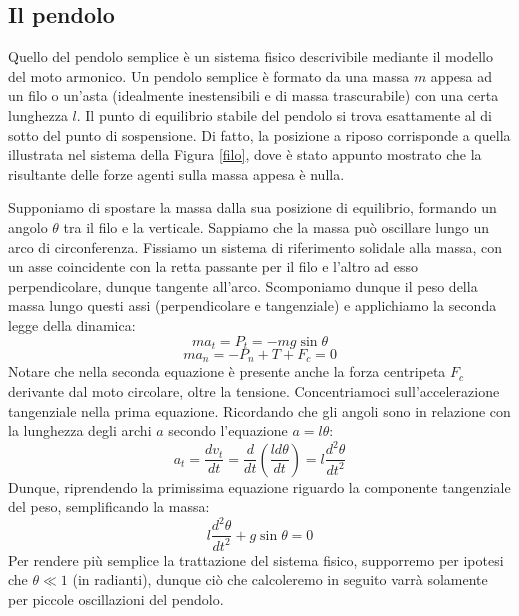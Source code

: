\subsection{Il pendolo}
Quello del pendolo semplice è un sistema fisico descrivibile mediante
il modello del moto armonico. Un pendolo semplice è formato da una massa
$m$ appesa ad un filo o un'asta (idealmente inestensibili e di massa
trascurabile) con una certa lunghezza $l$. Il punto di equilibrio stabile del pendolo si trova
esattamente al di sotto del punto di sospensione. Di fatto, la posizione
a riposo corrisponde a quella illustrata nel sistema della Figura
\ref{filo}, dove è stato appunto mostrato che la risultante delle
forze agenti sulla massa appesa è nulla.

Supponiamo di spostare la massa dalla sua posizione di equilibrio,
formando un angolo $\theta$ tra il filo e la verticale. Sappiamo che
la massa può oscillare lungo un arco di circonferenza. Fissiamo un
sistema di riferimento solidale alla massa, con un asse coincidente con
la retta passante per il filo e l'altro ad esso perpendicolare, dunque
tangente all'arco. Scomponiamo dunque il peso della massa lungo questi
assi (perpendicolare e tangenziale)  e applichiamo la seconda legge della
dinamica:
\[ ma_t = P_t = -mg\sin\theta \]
\[ ma_n = - P_n + T + F_c = 0 \]
Notare che nella seconda equazione è presente anche la forza centripeta
$F_c$ derivante dal moto circolare, oltre la tensione. Concentriamoci
sull'accelerazione tangenziale nella prima equazione. Ricordando che gli
angoli sono in relazione con la lunghezza degli archi $a$ secondo
l'equazione $a = l\theta$:
\[ a_t = \frac{dv_t}{dt} = \frac{d}{dt}\left(\frac{ld\theta}{dt}\right) = l\frac{d^2\theta}{dt^2} \]
Dunque, riprendendo la primissima equazione riguardo la componente
tangenziale del peso, semplificando la massa:
\[ l\frac{d^2\theta}{dt^2} + g\sin\theta = 0 \]
Per rendere più semplice la trattazione del sistema fisico, supporremo
per ipotesi che $\theta\ll 1$ (in radianti), dunque ciò che calcoleremo
in seguito varrà solamente per piccole oscillazioni del pendolo.
